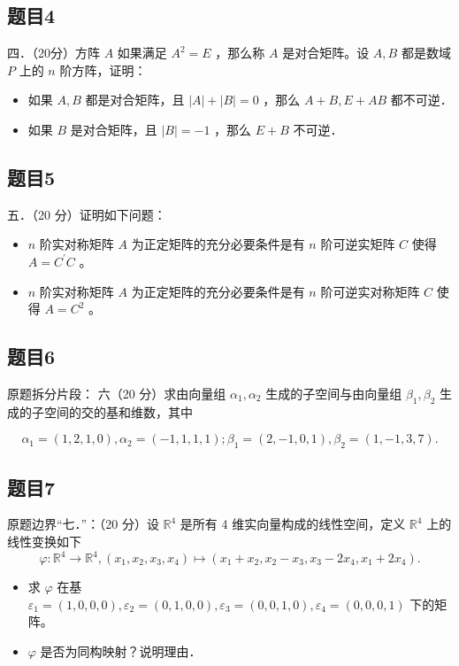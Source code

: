 \documentclass{article}
\begin{document}
\subsection{题目4}
四．（20分）方阵 \(A\) 如果满足 \(A^{2}=E\) ，那么称 \(A\) 是对合矩阵。设 \(A, B\) 都是数域 \(P\) 上的 \(n\) 阶方阵，证明：

\begin{itemize}
  \item[（1）] 如果 \(A, B\) 都是对合矩阵，且 \(|A|+|B|=0\) ，那么 \(A+B, E+A B\) 都不可逆．
  \item[（2）] 如果 \(B\) 是对合矩阵，且 \(|B|=-1\) ，那么 \(E+B\) 不可逆．
\end{itemize}

\subsection{题目5}
五．（20 分）证明如下问题：

\begin{itemize}
  \item[（1）] \(n\) 阶实对称矩阵 \(A\) 为正定矩阵的充分必要条件是有 \(n\) 阶可逆实矩阵 \(C\) 使得 \(A=C^{\prime} C\) 。
  \item[（2）] \(n\) 阶实对称矩阵 \(A\) 为正定矩阵的充分必要条件是有 \(n\) 阶可逆实对称矩阵 \(C\) 使得 \(A=C^{2}\) 。
\end{itemize}

\subsection{题目6}
原题拆分片段：
六（20 分）求由向量组 \(\alpha_{1}, \alpha_{2}\) 生成的子空间与由向量组 \(\beta_{1}, \beta_{2}\) 生成的子空间的交的基和维数，其中

\[
\alpha_{1}=(1,2,1,0), \alpha_{2}=(-1,1,1,1) ; \beta_{1}=(2,-1,0,1), \beta_{2}=(1,-1,3,7) .
\]

\subsection{题目7}
原题边界“七．”：（20 分）设 \(\mathbb{R}^{4}\) 是所有 4 维实向量构成的线性空间，定义 \(\mathbb{R}^{4}\) 上的线性变换如下
\[
\varphi: \mathbb{R}^{4} \rightarrow \mathbb{R}^{4},\left(x_{1}, x_{2}, x_{3}, x_{4}\right) \mapsto\left(x_{1}+x_{2}, x_{2}-x_{3}, x_{3}-2 x_{4}, x_{1}+2 x_{4}\right) .
\]

\begin{itemize}
\item[（1）] 求 \(\varphi\) 在基 \(\varepsilon_{1}=(1,0,0,0), \varepsilon_{2}=(0,1,0,0), \varepsilon_{3}=(0,0,1,0), \varepsilon_{4}=(0,0,0,1)\) 下的矩阵。
  \item[（2）] \(\varphi\) 是否为同构映射？说明理由．
\end{itemize}
\end{document}
